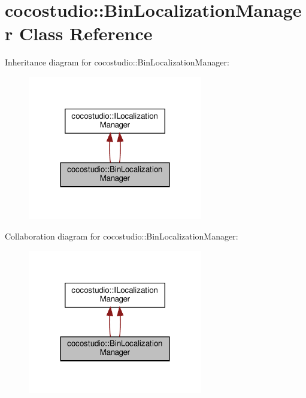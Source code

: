 \hypertarget{classcocostudio_1_1BinLocalizationManager}{}\section{cocostudio\+:\+:Bin\+Localization\+Manager Class Reference}
\label{classcocostudio_1_1BinLocalizationManager}


Inheritance diagram for cocostudio\+:\+:Bin\+Localization\+Manager\+:
\nopagebreak
\begin{figure}[H]
\begin{center}
\leavevmode
\includegraphics[width=216pt]{classcocostudio_1_1BinLocalizationManager__inherit__graph}
\end{center}
\end{figure}


Collaboration diagram for cocostudio\+:\+:Bin\+Localization\+Manager\+:
\nopagebreak
\begin{figure}[H]
\begin{center}
\leavevmode
\includegraphics[width=216pt]{classcocostudio_1_1BinLocalizationManager__coll__graph}
\end{center}
\end{figure}
